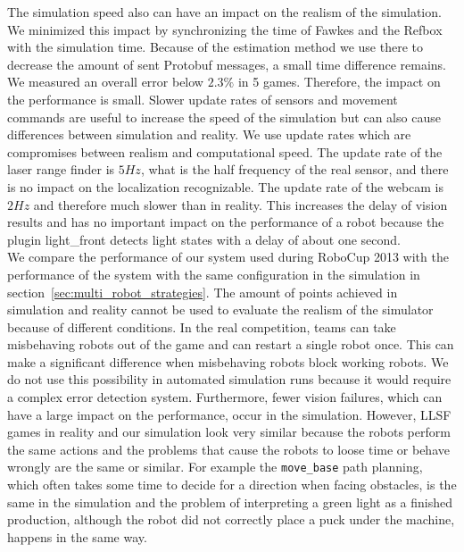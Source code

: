 The simulation speed also can have an impact on the realism of the simulation. We minimized this impact by synchronizing the time of Fawkes and the Refbox with the simulation time. Because of the estimation method we use there to decrease the amount of sent Protobuf messages, a small time difference remains. We measured an overall error below $2.3\%$ in 5 games. Therefore, the impact on the performance is small.
Slower update rates of sensors and movement commands are useful to increase the speed of the simulation but can also cause differences between simulation and reality. We use update rates which are compromises between realism and computational speed. The update rate of the laser range finder is $5 Hz$, what is the half frequency of the real sensor, and there is no impact on the localization recognizable. The update rate of the webcam is $2 Hz$ and therefore much slower than in reality. This increases the delay of vision results and has no important impact on the performance of a robot because the plugin light\_front detects light states with a delay of about one second.\\
We compare the performance of our system used during RoboCup 2013 with the performance of the system with the same configuration in the simulation in section~\ref{sec:multi_robot_strategies}. The amount of points achieved in simulation and reality cannot be used to evaluate the realism of the simulator because of different conditions. In the real competition, teams can take misbehaving robots out of the game and can restart a single robot once. This can make a significant difference when misbehaving robots block working robots. We do not use this possibility in automated simulation runs because it would require a complex error detection system. Furthermore, fewer vision failures, which can have a large impact on the performance, occur in the simulation. However, LLSF games in reality and our simulation look very similar because the robots perform the same actions and the problems that cause the robots to loose time or behave wrongly are the same or similar. For example the \texttt{move\_base} path planning, which often takes some time to decide for a direction when facing obstacles, is the same in the simulation and the problem of interpreting a green light as a finished production, although the robot did not correctly place a puck under the machine, happens in the same way.

